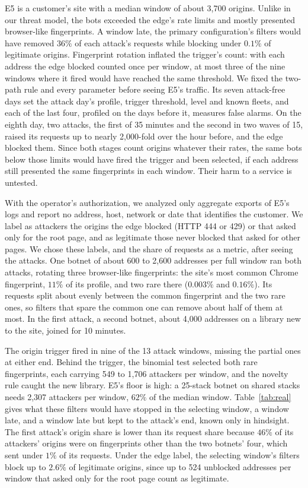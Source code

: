\documentclass[conference,letterpaper,10pt]{IEEEtran}
\newcommand\1{\textit{(i)}}
\newcommand\2{\textit{(ii)}}
\newcommand\3{\textit{(iii)}}
\newcommand\4{\textit{(iv)}}
\newcommand\5{\textit{(v)}}
\newcommand\6{\textit{(vi)}}
\newcommand\7{\textit{(vii)}}
\newcommand\8{\textit{(viii)}}
\newcommand\9{\textit{(ix)}}
\begin{document}
E5 is a customer's site with a median window of about 3,700 origins. Unlike in our threat model, the bots exceeded the edge's rate limits and mostly presented browser-like fingerprints. A window late, the primary configuration's filters would have removed $36\%$ of each attack's requests while blocking under $0.1\%$ of legitimate origins. Fingerprint rotation inflated the trigger's count: with each address the edge blocked counted once per window, at most three of the nine windows where it fired would have reached the same threshold. We fixed the two-path rule and every parameter before seeing E5's traffic. Its seven attack-free days set the attack day's profile, trigger threshold, level and known fleets, and each of the last four, profiled on the days before it, measures false alarms. On the eighth day, two attacks, the first of 35 minutes and the second in two waves of 15, raised its requests up to nearly 2,000-fold over the hour before, and the edge blocked them.  Since both stages count origins whatever their rates, the same bots below those limits would have fired the trigger and been selected, if each address still presented the same fingerprints in each window. Their harm to a service is untested.

With the operator's authorization, we analyzed only aggregate exports of E5's logs and report no address, host, network or date that identifies the customer. We label as attackers the origins the edge blocked (HTTP 444 or 429) or that asked only for the root page, and as legitimate those never blocked that asked for other pages. We chose these labels, and the share of requests as a metric, after seeing the attacks. One botnet of about 600 to 2,600 addresses per full window ran both attacks, rotating three browser-like fingerprints: the site's most common Chrome fingerprint, $11\%$ of its profile, and two rare there ($0.003\%$ and $0.16\%$). Its requests split about evenly between the common fingerprint and the two rare ones, so filters that spare the common one can remove about half of them at most. In the first attack, a second botnet, about 4,000 addresses on a library new to the site, joined for 10 minutes.

The origin trigger fired in nine of the 13 attack windows, missing the partial ones at either end.  Behind the trigger, the binomial test selected both rare fingerprints, each carrying 549 to 1,706 attackers per window, and the novelty rule caught the new library. E5's floor is high: a 25-stack botnet on shared stacks needs 2,307 attackers per window, $62\%$ of the median window. Table~\ref{tab:real} gives what these filters would have stopped in the selecting window, a window late, and a window late but kept to the attack's end, known only in hindsight. The first attack's origin share is lower than its request share because $46\%$ of its attackers' origins were on fingerprints other than the two botnets' four, which sent under $1\%$ of its requests. Under the edge label, the selecting window's filters block up to $2.6\%$ of legitimate origins, since up to 524 unblocked addresses per window that asked only for the root page count as legitimate.
\end{document}
